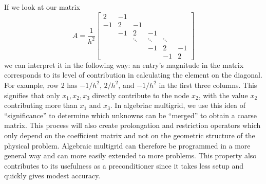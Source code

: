 \documentclass[11pt]{article}
\begin{document}
If we look at our matrix \[
A = \frac{1}{h^2}
\begin{bmatrix}
2  & -1 &        &        &        &   \\
-1 &  2 & -1     &        &        &   \\
   & -1 &  2     &     -1 &        &   \\
   &    & \ddots & \ddots & \ddots &   \\
   &    &        &     -1 &      2 & -1 \\
   &    &        &        &     -1 &  2
\end{bmatrix}
\] we can interpret it in the following way: an entry's magnitude in the
matrix corresponds to its level of contribution in calculating the
element on the diagonal. For example, row 2 has \(-1/h^2\), \(2/h^2\),
and \(-1/h^2\) in the first three columns. This signifies that only
\(x_1, x_2, x_3\) directly contribute to the node \(x_2\), with the
value \(x_2\) contributing more than \(x_1\) and \(x_3\). In algebriac
multigrid, we use this idea of ``significance'' to determine which
unknowns can be ``merged'' to obtain a coarse matrix. This process will
also create prolongation and restriction operators which only depend on
the coefficient matrix and not on the geometric structure of the
physical problem. Algebraic multigrid can therefore be programmed in a
more general way and can more easily extended to more problems. This
property also contributes to its usefulness as a preconditioner since it
takes less setup and quickly gives modest accuracy.


    
    
    
\end{document}
